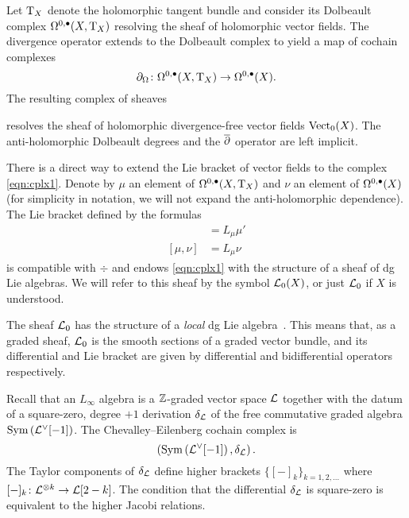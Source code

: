 Let ${\rm T}_X$ denote the holomorphic tangent bundle and consider its Dolbeault complex $\Omega^{0,\bullet}(X , {\rm T}_X)$ resolving the sheaf of holomorphic vector fields. 
The divergence operator extends to the Dolbeault complex to yield a map of cochain complexes 
\[
\partial_{\Omega} \colon \Omega^{0,\bullet}(X , {\rm T}_X) \to \Omega^{0,\bullet}(X) .
\]
The resulting complex of sheaves
\beqn\label{eqn:cplx1}
\eeqn
resolves the sheaf of holomorphic divergence-free vector fields ${\rm Vect}_0 (X)$.
The anti-holomorphic Dolbeault degrees and the $\overline{\partial}$ operator are left implicit. 

There is a direct way to extend the Lie bracket of vector fields to the complex \eqref{eqn:cplx1}. 
Denote by $\mu$ an element of $\Omega^{0,\bullet}(X , {\rm T}_X)$ and $\nu$ an element of $\Omega^{0,\bullet}(X)$ (for simplicity in notation, we will not expand the anti-holomorphic dependence). 
The Lie bracket defined by the formulas
\begin{align*}
[\mu, \mu'] & = L_\mu \mu' \\
[\mu, \nu] & = L_\mu \nu 
\end{align*}
is compatible with $\div$ and endows \eqref{eqn:cplx1} with the structure of a sheaf of dg Lie algebras.
We will refer to this sheaf by the symbol $\mathcal L_0(X)$, or just $\mathcal L_0$ if $X$ is understood. 

The sheaf $\mathcal L_0$ has the structure of a {\em local} dg Lie algebra~\cite[\S 3.1.3]{CG2}.
This means that, as a graded sheaf, $\mathcal L_0$ is the smooth sections of a graded vector bundle, and its differential and Lie bracket are given by differential and bidifferential operators respectively.



Recall that an $L_\infty$ algebra is a $\mathbb Z$-graded vector space $\mathcal L$ together with the datum of a square-zero, degree $+1$ derivation $\delta_\mathcal L$ of the free commutative graded algebra $\operatorname{Sym}\left(\mathcal L^\vee [-1] \right)$. 
The Chevalley--Eilenberg cochain complex is 
\[
\left(\operatorname{Sym}\left(\mathcal L^\vee [-1] \right), \delta_\mathcal L\right) .
\]
The Taylor components of $\delta_\mathcal L$ define higher brackets $\{[-]_k\}_{k=1,2,\ldots}$ where $[-]_k \colon \mathcal L^{\otimes k} \to \mathcal L[2-k]$. 
The condition that the differential $\delta_\mathcal L$ is square-zero is equivalent to the higher Jacobi relations.


